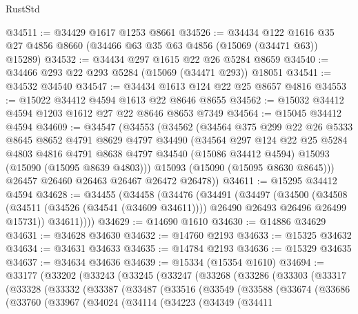 \begin{lexlean}{RustStd}
\begin{coremodule}
@34511 := @34429 @1617 @1253 @8661
@34526 := @34434
    @122
    @1616
    @35
    @27
    @4856
    @8660
    (@34466 @63 @35 @63 @4856 (@15069 (@34471 @63)) @15289)
@34532 := @34434 @297 @1615 @22 @26 @5284 @8659
@34540 := @34466 @293 @22 @293 @5284 (@15069 (@34471 @293)) @18051
@34541 := @34532 @34540
@34547 := @34434 @1613 @124 @22 @25 @8657 @4816
@34553 := @15022 @34412 @4594 @1613 @22 @8646 @8655
@34562 := @15032 @34412 @4594 @1203 @1612 @27 @22 @8646 @8653 @7349
@34564 := @15045 @34412 @4594
@34609 := @34547
    (@34553
      (@34562
        (@34564
          @375
          @299
          @22
          @26
          @5333
          @8645
          @8652
          @4791
          @8629
          @4797
          @34490
          (@34564
            @297
            @124
            @22
            @25
            @5284
            @4803
            @4816
            @4791
            @8638
            @4797
            @34540
            (@15086 @34412 @4594)
            @15093
            (@15090 (@15095 @8639 @4803)))
          @15093
          (@15090 (@15095 @8630 @8645)))
        @26457
        @26460
        @26463
        @26467
        @26472
        @26478))
@34611 := @15295 @34412 @4594
@34628 := @34455
    (@34458
      (@34476
        (@34491
          (@34497
            (@34500
              (@34508
                (@34511 (@34526 (@34541 (@34609 @34611))))
                @26490
                @26493
                @26496
                @26499
                @15731))
            @34611))))
@34629 := @14690 @1610
@34630 := @14886 @34629
@34631 := @34628 @34630
@34632 := @14760 @2193
@34633 := @15325 @34632
@34634 := @34631 @34633
@34635 := @14784 @2193
@34636 := @15329 @34635
@34637 := @34634 @34636
@34639 := @15334 (@15354 @1610)
@34694 := @33177
    (@33202
      (@33243
        (@33245
          (@33247
            (@33268
              (@33286
                (@33303
                  (@33317
                    (@33328
                      (@33332
                        (@33387
                          (@33487
                            (@33516
                              (@33549
                                (@33588
                                  (@33674
                                    (@33686
                                      (@33760
                                        (@33967
                                          (@34024
                                            (@34114
                                              (@34223
                                                (@34349
                                                  (@34411

\end{coremodule}
\end{lexlean}
